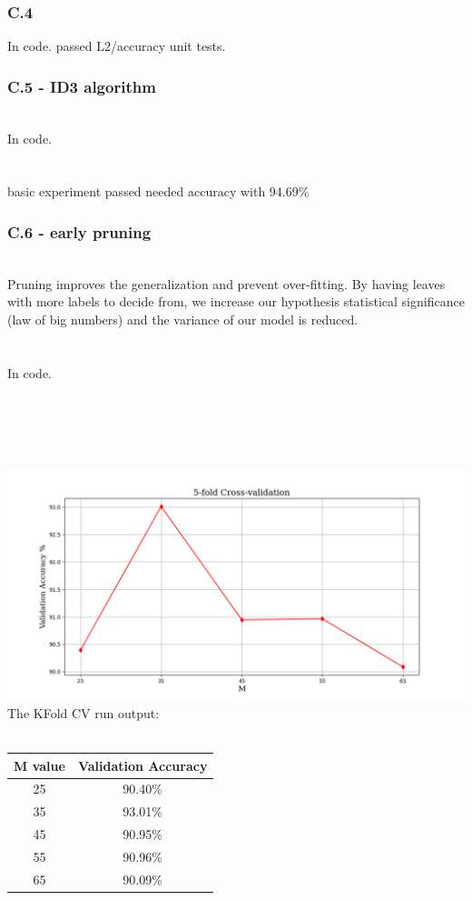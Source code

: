 \documentclass[12pt]{article}
\begin{document}
\subsubsection*{C.4}
In code. passed L2/accuracy unit tests.
\subsubsection*{C.5 - ID3 algorithm}
\\
In code.\\
\\
\\
basic experiment passed needed accuracy with 94.69\%

\subsubsection*{C.6 - early pruning}
\\
Pruning improves the generalization and prevent over-fitting. By having leaves with more labels to decide from, we increase our hypothesis statistical significance (law of big numbers) and the variance of our model is reduced.\\
\\
\\
In code.\\
\\
\newpage
{}\\
\\
\\
\\
\includegraphics[scale=0.4]{hw3/plots/cv4.png}
\\
The KFold CV run output:\\
\\
\begin{center}
\begin{tabular}{ ||c|c|| } 
 \hline
 M value & Validation Accuracy \\ 
 \hline
 25 & 90.40\% \\ 
 35 & 93.01\% \\ 
 45 & 90.95\% \\ 
 55 & 90.96\% \\ 
 65 & 90.09\% \\ 
 \hline
\end{tabular}
\end{center}
\end{document}

